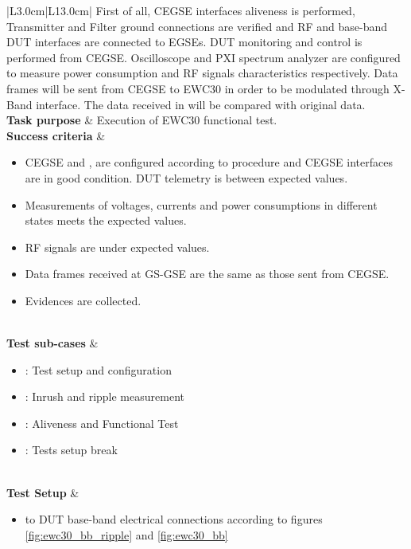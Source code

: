 \begin{table}[H]
\begin{tabular}{|L{3.0cm}|L{13.0cm}|}
		First of all, CEGSE interfaces aliveness is performed,
  Transmitter and Filter ground connections are verified and 
   RF and base-band DUT interfaces are connected to EGSEs.
   DUT monitoring and control is performed from CEGSE{}.
  Oscilloscope and PXI spectrum analyzer are configured 
  to measure power consumption and RF signals characteristics respectively.
Data frames will be sent from CEGSE to  EWC30 in order to be modulated through X-Band interface. 
 The data received in \fmr{} will be compared with 
 original data.\\
		\hline
		\textbf{Task purpose} & Execution of EWC30 functional test. \\
		\hline
		\textbf{Success criteria} & 			\begin{minipage}[t]{\linewidth}
			\begin{itemize}[nosep,after=\strut]
		\item CEGSE and \fmr{}, are configured according to procedure and CEGSE interfaces are in good condition.
DUT telemetry is between expected values.
	\item Measurements of voltages, currents and power consumptions in different states meets the expected values.
	\item RF signals are under expected values.
	\item Data frames received at GS-GSE are the same as those sent from CEGSE.
	\item Evidences are collected. 
				\end{itemize}
		\end{minipage}\\
		\hline
		\textbf{Test sub-cases} & 
\begin{minipage}[t]{\linewidth}
		\begin{itemize}[nosep,after=\strut]
		\item {}: Test setup and configuration
		\item {}: Inrush and ripple measurement 
		\item {}: Aliveness and Functional Test
		\item {}: Tests setup break
		\end{itemize}
		\end{minipage}\\
		\hline
		\textbf{Test Setup} &
\begin{minipage}[t]{\linewidth}
	\begin{itemize}[nosep,after=\strut]
		\item \comEgse\xspace to DUT base-band electrical connections according to figures \ref{fig:ewc30_bb_ripple} and \ref{fig:ewc30_bb} 

\end{itemize}
\end{minipage}
\end{tabular}
\end{table}
